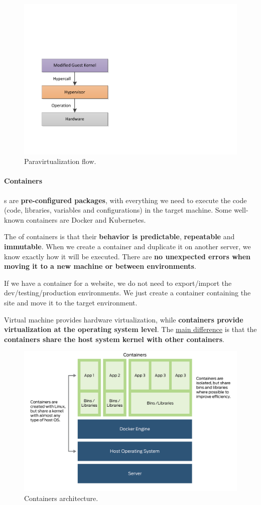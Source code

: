 \begin{figure}[!htp]
	\centering
	\includegraphics[width=.4\textwidth]{img/paravirtualization-2.pdf}
	\caption{Paravirtualization flow.}
\end{figure}

\newpage

\paragraph{Containers}

s are \textbf{pre-configured packages}, with everything we need to execute the code (code, libraries, variables and configurations) in the target machine. Some well-known containers are Docker and Kubernetes.

\highspace
The  of containers is that their \textbf{behavior is predictable}, \textbf{repeatable} and \textbf{immutable}. When we create a  container and duplicate it on another server, we know exactly how it will be executed. There are \textbf{no unexpected errors when moving it to a new machine or between environments}.

\begin{examplebox}
	If we have a container for a website, we do not need to export/import the dev/testing/production environments. We just create a container containing the site and move it to the target environment.
\end{examplebox}

\noindent
Virtual machine provides hardware virtualization, while \textbf{containers provide virtualization at the operating system level}. The \underline{main difference} is that the \textbf{containers share the host system kernel with other containers}.

\begin{figure}[!htp]
	\centering
	\includegraphics[width=\textwidth]{img/containers-1.png}
	\caption{Containers architecture.}
\end{figure}

